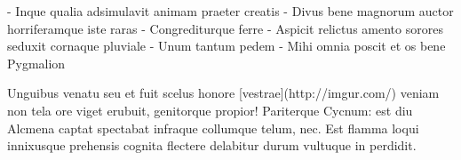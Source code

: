 \documentclass{article}
\begin{document}
- Inque qualia adsimulavit animam praeter creatis
- Divus bene magnorum auctor horriferamque iste raras
- Congrediturque ferre
- Aspicit relictus amento sorores seduxit cornaque pluviale
- Unum tantum pedem
- Mihi omnia poscit et os bene Pygmalion

Unguibus venatu seu et fuit scelus honore [vestrae](http://imgur.com/) veniam
non tela ore viget erubuit, genitorque propior! Pariterque Cycnum: est diu
Alcmena captat spectabat infraque collumque telum, nec. Est flamma loqui
innixusque prehensis cognita flectere delabitur durum vultuque in perdidit.
\end{document}
